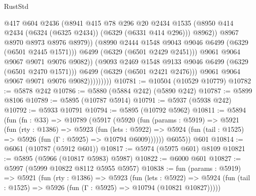 \begin{lexlean}{RustStd}
\begin{coremodule}
{{                                    @417
                                    @604
                                    @2436
                                    (@8941
                                      @415
                                      @78
                                      @296
                                      @20
                                      @2434
                                      @1535
                                      (@8950
                                        @414
                                        @2434
                                        (@6324 (@6325 @2434))
                                        (@6329 (@6331 @414 @296)))
                                      @8962))
                                  @8967
                                  @8970
                                  @8973
                                  @8976
                                  @8979))
                              (@8990 @2444 @1548 @9043 @9046 @6499 (@6329 (@6501 @2445 @1571)))
                              @6499
                              (@6329 (@6501 @2429 @2451)))
                            @9061
                            @9064
                            @9067
                            @9071
                            @9076
                            @9082))
                        (@9093 @2469 @1548 @9133 @9046 @6499 (@6329 (@6501 @2470 @1571)))
                        @6499
                        (@6329 (@6501 @2421 @2476)))
                      @9061
                      @9064
                      @9067
                      @9071
                      @9076
                      @9082)))))))))
@10781 := @10504 (@10529 @10779)
@10782 := @5878 @242
@10786 := @5880 (@5884 @242) (@5890 @242)
@10787 := @5899 @8106
@10789 := @5895 (@10787 @5914)
@10791 := @5937 (@5938 @242)
@10792 := @5933 @10791
@10794 := @5895 (@10792 @5962)
@10811 := @5894
    (fun (fn : @33) =>
    @10789
      (@5917
        (@5920
          (fun (params : @5919) =>
          @5921
            (fun (rty : @1386) =>
            @5923
              (fun (lets : @5922) =>
              @5924 (fun (tail : @1525) => @5926 (fun (Γ : @5925) => @10794 @6009))))))
        @6055))
    @601
@10814 := @6061 (@10787 (@5912 @601))
@10817 := @5974 (@5975 @601) @8109
@10821 := @5895 (@5966 (@10817 @5983) @5987)
@10822 := @6000 @601
@10827 := @5997 (@5999 @10822 @8112 @5955 @5957)
@10838 := fun (params : @5919) =>
  @5921
    (fun (rty : @1386) =>
    @5923
      (fun (lets : @5922) =>
      @5924 (fun (tail : @1525) => @5926 (fun (Γ : @5925) => @10794 (@10821 @10827)))))
}}
\end{coremodule}
\end{lexlean}

